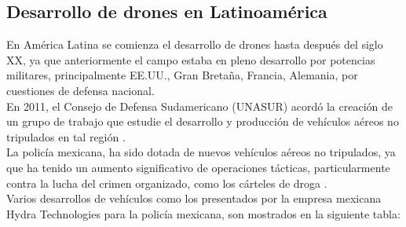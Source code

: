 \subsection{Desarrollo de drones en Latinoamérica}
En América Latina se comienza el desarrollo de drones hasta después del siglo 
XX, ya que anteriormente el campo estaba en pleno desarrollo por potencias 
militares, principalmente EE.UU., Gran Bretaña, Francia, Alemania, por 
cuestiones de defensa nacional. \\
En 2011, el Consejo de Defensa Sudamericano (UNASUR) acordó la creación de un 
grupo de trabajo que estudie el desarrollo y producción de vehículos aéreos no 
tripulados en tal región \cite{vehiculos_aereos_lat}. \\
La policía mexicana, ha sido dotada de nuevos vehículos aéreos no tripulados, ya 
que ha tenido un aumento significativo de operaciones tácticas, particularmente 
contra la lucha del crimen organizado, como los cárteles de droga 
\cite{vehiculos_aereos_lat}. \\
Varios desarrollos de vehículos como los presentados por la empresa mexicana 
Hydra Technologies para la policía mexicana, son mostrados en la siguiente 
tabla:

